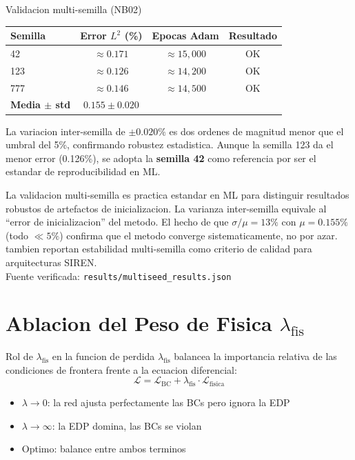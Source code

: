 \documentclass[12pt,a4paper]{article}
\newcommand{\code}[1]{\texttt{\color{azulujat}#1}}
\begin{document}
\begin{resultbox}{Validacion multi-semilla (NB02)}
\begin{tabular}{lccc}
\toprule
Semilla & Error $L^2$ (\%) & Epocas Adam & Resultado \\
\midrule
42  & $\approx0.171$ & $\approx15{,}000$ & OK \\
123 & $\approx0.126$ & $\approx14{,}200$ & OK \\
777 & $\approx0.146$ & $\approx14{,}500$ & OK \\
\midrule
\textbf{Media $\pm$ std} & $\mathbf{0.155 \pm 0.020}$ & & \\
\bottomrule
\end{tabular}

\vspace{4pt}
La variacion inter-semilla de $\pm0.020\%$ es dos ordenes de magnitud menor
que el umbral del 5\%, confirmando robustez estadistica.
Aunque la semilla 123 da el menor error (0.126\%), se adopta la \textbf{semilla 42}
como referencia por ser el estandar de reproducibilidad en ML.
\end{resultbox}

\begin{litbox}
La validacion multi-semilla es practica estandar en ML para distinguir resultados
robustos de artefactos de inicializacion. La varianza inter-semilla equivale al
``error de inicializacion'' del metodo. El hecho de que $\sigma/\mu = 13\%$ con
$\mu = 0.155\%$ (todo $\ll 5\%$) confirma que el metodo converge sistematicamente,
no por azar. \textcite{sitzmann2020} tambien reportan estabilidad multi-semilla
como criterio de calidad para arquitecturas SIREN.\\[4pt]
Fuente verificada: \code{results/multiseed\_results.json}
\end{litbox}

\section{Ablacion del Peso de Fisica $\lambda_\text{fis}$}
\label{sec:ablacion}

\begin{definbox}{Rol de $\lambda_\text{fis}$ en la funcion de perdida}
$\lambda_\text{fis}$ balancea la importancia relativa de las condiciones de
frontera frente a la ecuacion diferencial:
\[
  \mathcal{L} = \mathcal{L}_\text{BC} + \lambda_\text{fis}\cdot\mathcal{L}_\text{fisica}
\]
\begin{itemize}
  \item $\lambda \to 0$: la red ajusta perfectamente las BCs pero ignora la EDP
  \item $\lambda \to \infty$: la EDP domina, las BCs se violan
  \item Optimo: balance entre ambos terminos
\end{itemize}
\end{definbox}
\end{document}
